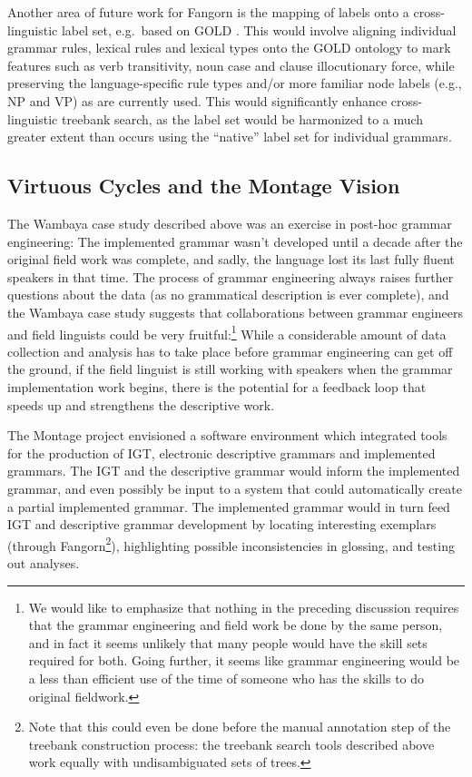 Another area of future work for Fangorn is the mapping of labels
onto a cross-linguistic label set, e.g.\ based on GOLD
\citep{Farrar:Lewis:2007}. This would involve aligning individual grammar
rules, lexical rules and lexical types onto the GOLD ontology to mark
features such as verb transitivity, noun case and clause illocutionary
force, while preserving the language-specific rule types and/or more
familiar node labels (e.g., {\small NP} and {\small VP}) as are 
currently used. This would significantly enhance cross-linguistic
treebank search, as the label set would be harmonized to a much greater
extent than occurs using the ``native'' label set for individual
grammars.


\subsection{Virtuous Cycles and the Montage Vision} 

The Wambaya case study described above was an exercise in post-hoc
grammar engineering: The implemented grammar wasn't developed until a
decade after the original field work was complete, and sadly, the
language lost its last fully fluent speakers in that time.  The process
of grammar engineering always raises further questions about the data
(as no grammatical description is ever complete), and the Wambaya case
study suggests that collaborations between grammar engineers and field
linguists could be very fruitful:\footnote{We would like to emphasize that nothing in the
  preceding discussion requires that the grammar engineering and field
  work be done by the same person, and in fact it seems unlikely that many
  people would have the skill sets required for both. Going further,
  it seems like grammar engineering would be a less than efficient use
  of the time of someone who has the skills to do original fieldwork.}
While a considerable amount of data collection and analysis has to
take place before grammar engineering can get off the ground, if the
field linguist is still working with speakers when the grammar
implementation work begins, there is the potential for a feedback loop
that speeds up and strengthens the descriptive work.

The Montage project \citep{Ben:Fli:Goo:Sag:04} envisioned a software
environment which integrated tools for the production of IGT,
electronic descriptive grammars and implemented grammars.  The IGT and
the descriptive grammar would inform the implemented grammar, and even
possibly be input to a system that could automatically create a
partial implemented grammar. The implemented grammar would in turn
feed IGT and descriptive grammar development by locating interesting
exemplars (through Fangorn\footnote{Note that this could even
  be done before the manual annotation step of the treebank
  construction process: the treebank search tools described above work
  equally with undisambiguated sets of trees.}), highlighting
possible inconsistencies in glossing, and testing out analyses.

